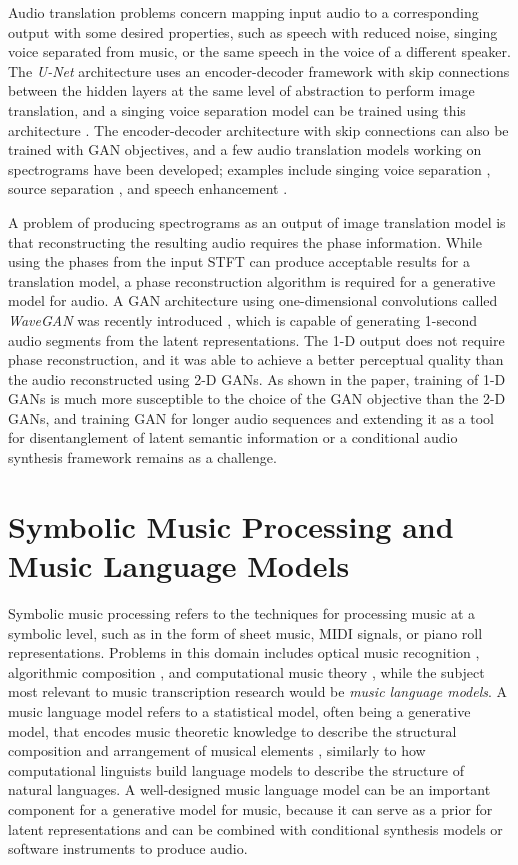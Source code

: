 Audio translation problems concern mapping input audio to a corresponding output with some desired properties, such as speech with reduced noise, singing voice separated from music, or the same speech in the voice of a different speaker.
The \emph{U-Net} architecture \cite{ronneberger2015unet} uses an encoder-decoder framework with skip connections between the hidden layers at the same level of abstraction to perform image translation, and a singing voice separation model can be trained using this architecture \cite{jansson2017separation}.
The encoder-decoder architecture with skip connections can also be trained with GAN objectives, and a few audio translation models working on spectrograms have been developed; examples include singing voice separation \cite{fan2017svsgan, stoller2017separation}, source separation \cite{subakan2017gan}, and speech enhancement \cite{pascual2017segan, donahue2017segan}.

A problem of producing spectrograms as an output of image translation model is that reconstructing the resulting audio requires the phase information.
While using the phases from the input STFT can produce acceptable results for a translation model, a phase reconstruction algorithm is required for a generative model for audio.
A GAN architecture using one-dimensional convolutions called \emph{WaveGAN} was recently introduced \cite{donahue2018wavegan}, which is capable of generating 1-second audio segments from the latent representations.
The 1-D output does not require phase reconstruction, and it was able to achieve a better perceptual quality than the audio reconstructed using 2-D GANs.
As shown in the paper, training of 1-D GANs is much more susceptible to the choice of the GAN objective than the 2-D GANs, and training GAN for longer audio sequences and extending it as a tool for disentanglement of latent semantic information or a conditional audio synthesis framework remains as a challenge.

\section{Symbolic Music Processing and Music Language Models}

Symbolic music processing refers to the techniques for processing music at a symbolic level, such as in the form of sheet music, MIDI signals, or piano roll representations.
Problems in this domain includes optical music recognition \cite{rebelo2012omr}, algorithmic composition \cite{fernandez2013ai}, and computational music theory \cite{hamanaka2013computational}, while the subject most relevant to music transcription research would be \emph{music language models}.
A music language model refers to a statistical model, often being a generative model, that encodes music theoretic knowledge to describe the structural composition and arrangement of musical elements \cite{patel2010musiclanguage}, similarly to how computational linguists build language models to describe the structure of natural languages.
A well-designed music language model can be an important component for a generative model for music, because it can serve as a prior for latent representations and can be combined with conditional synthesis models or software instruments to produce audio.

